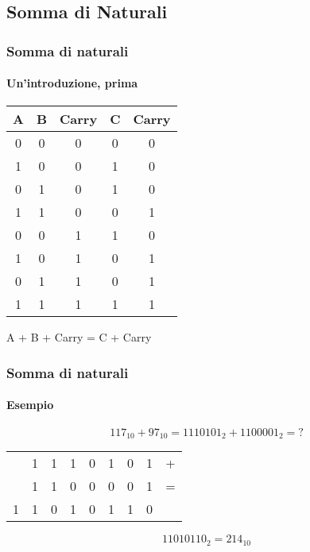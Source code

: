 \documentclass{beamer}
\begin{document}
	\subsection[NatSum]{Somma di Naturali}  
	  \begin{frame}
	    \frametitle{Somma di naturali}
	    \framesubtitle{Un'introduzione, prima}
			\begin{center}
	    \begin{tabular}{|c|c|c||c|c|}
	    		\hline
	    			A & B & Carry & C & Carry \\
	    		\hline
	    			0 & 0 & 0 & 0 & 0 \\
	    			1 & 0 & 0 & 1 & 0 \\
	    			0 & 1 & 0 & 1 & 0 \\
	    			1 & 1 & 0 & 0 & 1 \\
	    			0 & 0 & 1 & 1 & 0 \\
	    			1 & 0 & 1 & 0 & 1 \\
	    			0 & 1 & 1 & 0 & 1 \\
	    			1 & 1 & 1 & 1 & 1 \\
	    		\hline
	    \end{tabular}
	    
	    \vspace{2em}
	    
	    A + B + Carry = C + Carry
	    \end{center}	  
	  \end{frame}
	  \begin{frame}
	    \frametitle{Somma di naturali}
	    \framesubtitle{Esempio}
	    $$117_{10} + 97_{10} = 1110101_{2} + 1100001_{2} = \text{?}$$
	    \vspace{2em}
	    \pause
			\begin{center}
			\begin{tabular}{cccccccc|c} 
			 & 1 & 1 & 1 & 0 & 1 & 0 & 1 & + \\  
			 & 1 & 1 & 0 & 0 & 0 & 0 & 1 & = \\ 
			\hline 
			1 & 1 & 0 & 1 & 0 & 1 & 1 & 0 &  \\ 
			\end{tabular}
			\end{center}
			\pause
			\vspace{2em}
			$$11010110_{2} = 214_{10}$$
	  \end{frame}
\end{document}
